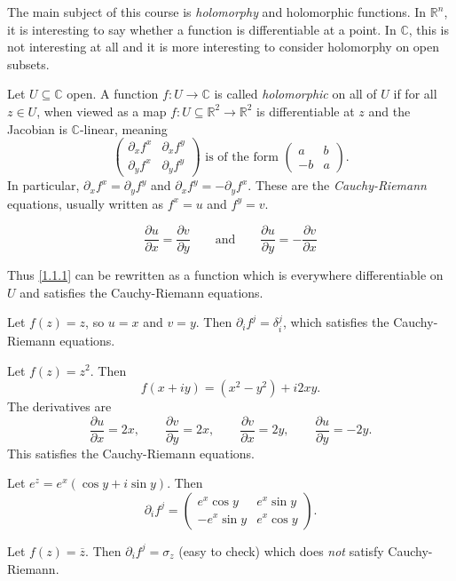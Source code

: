 The main subject of this course is \emph{holomorphy} and holomorphic functions. In $\mathbb{R} ^n$, it is interesting to say whether a function is differentiable at a point. In $\mathbb{C} $, this is not interesting at all and it is more interesting to consider holomorphy on open subsets.

\begin{definition}\label{1.1.1}
	Let $U\subseteq \mathbb{C} $ open. A function $f : U \to \mathbb{C} $ is called \emph{holomorphic} on all of $U$ if for all $z\in U$, when viewed as a map $f : U\subseteq \mathbb{R} ^2 \to \mathbb{R} ^2$ is differentiable at $z$ and the Jacobian is $\mathbb{C} $-linear, meaning
	\[
		\begin{pmatrix}
		\partial _xf^x & \partial _xf^y \\
		\partial _yf^x & \partial _yf^y
		\end{pmatrix}\text{ is of the form } \begin{pmatrix}
		a & b \\
		-b & a
		\end{pmatrix}
	.\]
	In particular, $\partial _xf^x=\partial _yf^y$ and $\partial _xf^y=-\partial _yf^x$. These are the \emph{Cauchy-Riemann} equations, usually written as $f^x=u$ and $f^y=v$.
\end{definition}

\begin{mdframed}
	\[
		\frac{\partial u}{\partial x} =\frac{\partial v}{\partial y} \qquad \text{and} \qquad \frac{\partial u}{\partial y} =-\frac{\partial v}{\partial x} 
	\]
\end{mdframed}

Thus \cref{1.1.1} can be rewritten as a function which is everywhere differentiable on $U$ and satisfies the Cauchy-Riemann equations.

\begin{example}\label{1.1.2}
	Let $f(z)=z$, so $u=x$ and $v=y$. Then $\partial _if^j=\delta _{i} ^j$, which satisfies the Cauchy-Riemann equations.

	Let $f(z)=z^2$. Then
	\[
		f(x+iy)=(x^2-y^2)+i2xy
	.\]
	The derivatives are
	\[
		\frac{\partial u}{\partial x} =2x,\qquad \frac{\partial v}{\partial y} =2x,\qquad \frac{\partial v}{\partial x} =2y,\qquad \frac{\partial u}{\partial y} =-2y
	.\]
	This satisfies the Cauchy-Riemann equations.

	Let $e^z=e^x\left( \cos y+i \sin y \right) $. Then
	\[
		\partial _if^j=\begin{pmatrix}
		e^x \cos y & e^x \sin y \\
		-e^x \sin y & e^x \cos y
		\end{pmatrix}
	.\]
	
	Let $f(z)=\overline{z} $. Then $\partial _if^j=\sigma _z$ (easy to check) which does \emph{not} satisfy Cauchy-Riemann.
\end{example}

